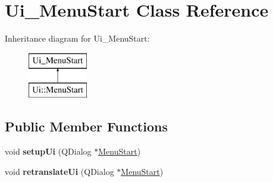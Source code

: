 \hypertarget{class_ui___menu_start}{}\section{Ui\+\_\+\+Menu\+Start Class Reference}
\label{class_ui___menu_start}
Inheritance diagram for Ui\+\_\+\+Menu\+Start\+:\begin{figure}[H]
\begin{center}
\leavevmode
\includegraphics[height=2.000000cm]{class_ui___menu_start}
\end{center}
\end{figure}
\subsection*{Public Member Functions}
\begin{DoxyCompactItemize}
\item 
\mbox{\label{class_ui___menu_start_a2c829c09e6c5cee3a6eb27777f41b4d7}} 
void {\bfseries setup\+Ui} (Q\+Dialog $\ast$\mbox{\hyperlink{class_menu_start}{Menu\+Start}})
\item 
\mbox{\label{class_ui___menu_start_aef0991221e943ae0621380cc743acec5}} 
void {\bfseries retranslate\+Ui} (Q\+Dialog $\ast$\mbox{\hyperlink{class_menu_start}{Menu\+Start}})
\end{DoxyCompactItemize}
